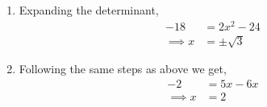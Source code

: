 \begin{enumerate}
\item Expanding the determinant, 
\begin{align}
-18&= 2x^2 -24 \\
\implies x&= \pm\sqrt{3}
\end{align}
\item Following the same steps as above we get,
\begin{align}
-2&= 5x-6x\\
\implies x&= 2
\end{align}

\end{enumerate}
